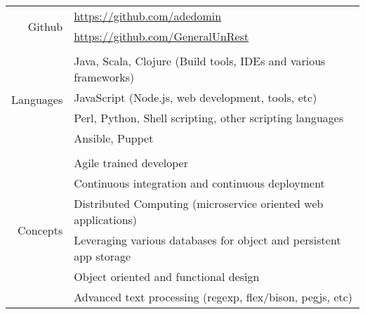 \documentclass[9pt,letterpaper,]{article}
\begin{document}
\begin{center}
\begin{longtable}{r|l}
    \multirow{2}{*}{Github} & \href{https://github.com/adedomin}{https://github.com/adedomin} \\
                            & \href{https://github.com/GeneralUnRest}{https://github.com/GeneralUnRest} \\
    \\
    \multirow{4}{*}{Languages} & Java, Scala, Clojure (Build tools, IDEs and various frameworks) \\
                               & JavaScript (Node.js, web development, tools, etc) \\
                               & Perl, Python, Shell scripting, other scripting languages \\
                               & Ansible, Puppet \\
    \\
    \multirow{6}{*}{Concepts} & Agile trained developer \\
                              & Continuous integration and continuous deployment \\
                              & Distributed Computing (microservice oriented web applications) \\
                              & Leveraging various databases for object and persistent app storage \\
                              & Object oriented and functional design \\
                              & Advanced text processing (regexp, flex/bison, pegjs, etc) \\
\end{longtable}
\end{center}
\end{document}

